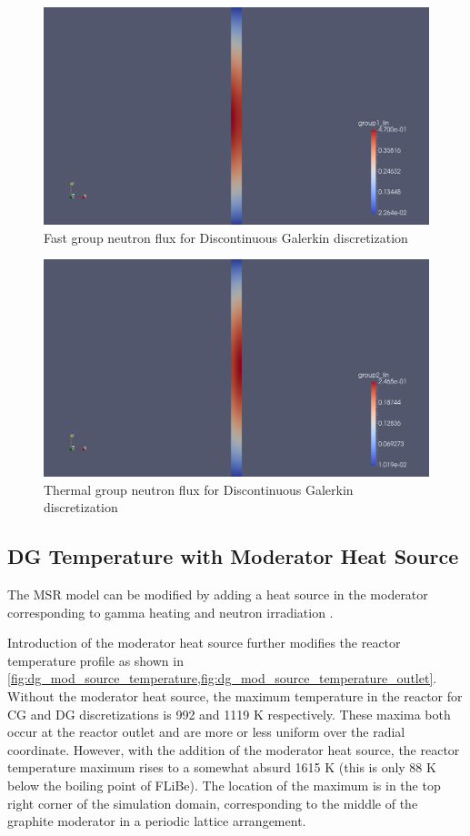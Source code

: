 \documentclass{article}
\let\Oldsubsection\subsection
\renewcommand{\subsection}{\FloatBarrier\Oldsubsection}
\begin{document}
\begin{figure}[htpb]
  \centering
  \includegraphics[width=.5\textwidth]{dg_group1.png}
  \caption{Fast group neutron flux for Discontinuous Galerkin discretization}
  \label{fig:dg_group1}
\end{figure}

\begin{figure}[htpb]
  \centering
  \includegraphics[width=.5\textwidth]{dg_group2.png}
  \caption{Thermal group neutron flux for Discontinuous Galerkin discretization}
  \label{fig:dg_group2}
\end{figure}

\FloatBarrier

\subsection{DG Temperature with Moderator Heat Source}

The \gls{MSR} model can be modified by adding a heat source in the moderator
corresponding to gamma heating and neutron irradiation \cite{robertson_conceptual_1971}.

Introduction of the moderator heat source further modifies the reactor
temperature profile as shown in
\cref{fig:dg_mod_source_temperature,fig:dg_mod_source_temperature_outlet}. Without
the moderator heat source, the maximum temperature in the reactor for \gls{CG}
and \gls{DG} discretizations is 992 and 1119 K respectively. These maxima both
occur at the reactor outlet and are more or less uniform over the radial
coordinate. However, with the addition of the moderator heat source, the reactor
temperature maximum rises to a somewhat absurd 1615 K (this is only 88 K below
the boiling point of \gls{FLiBe}). The location of the maximum is in the top right
corner of the simulation domain, corresponding to the middle of the graphite
moderator in a periodic lattice arrangement.
\end{document}
